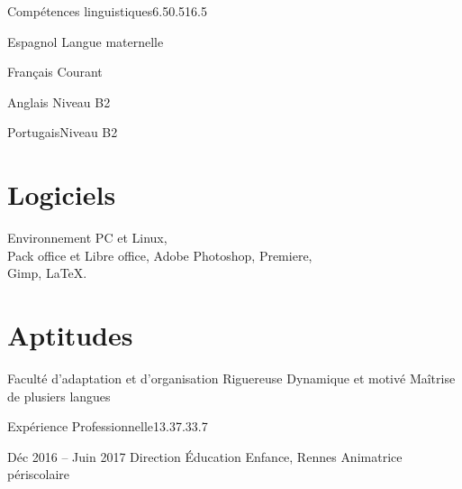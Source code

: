 \documentclass[30pt, french]{tccv}
\begin{document}
\begin{upshape}
\begin{rounded_frame}{Compétences linguistiques}{6.5}{0.5}{16.5}{}
\begin{factlist}
\item{Espagnol} {Langue maternelle}	
\item{Français} {Courant}	
\item{Anglais}  {Niveau B2}	
\item{Portugais}{Niveau B2}
\end{factlist}

\vspace{0.5cm}
\section{Logiciels}
Environnement PC et Linux, \\
Pack office et Libre office,
Adobe Photoshop, Premiere, \\
Gimp,
\LaTeX.

\vspace{0.5cm}
\section{Aptitudes}
\begin{itemize}[leftmargin=13pt]
  \setlength\itemsep{-3pt} 

  \cvitem[\checkmark]  Faculté d'adaptation et d'organisation
  \cvitem[\checkmark]  Riguereuse
  \cvitem[\checkmark]  Dynamique et motivé
  \cvitem[\checkmark]  Maîtrise de plusiers langues
\end{itemize}

\vspace{0.3cm}

\end{rounded_frame}




%
%


\begin{flat_frame}{Expérience Professionnelle}{13.3}{7.3}{3.7}{}
\begin{eventlist}


    
    
    
\item{Déc 2016 -- Juin 2017}
     {Direction Éducation Enfance, Rennes}
     {Animatrice périscolaire}
     \fontsize{9pt}{1em}\color{text}\bodyfontlight\upshape\selectfont
    

\end{eventlist}
\end{flat_frame}
\end{upshape}
\end{document}
